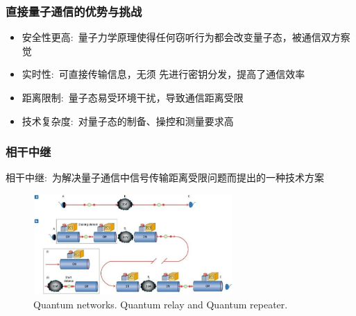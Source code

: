 \begin{frame}
    \frametitle{直接量子通信的优势与挑战}
    \begin{itemize}
        \item 安全性更高:~量子力学原理使得任何窃听行为都会改变量子态，被通信双方察觉
        \item 实时性:~可直接传输信息，无须%
		先进行密钥分发，提高了通信效率
    \end{itemize}
    \begin{itemize}
        \item 距离限制:~量子态易受环境干扰，导致通信距离受限\\
		{\fontsize{7.5pt}{5.2pt}\selectfont{目前难以实现长距离的直接量子通信}}
        \item 技术复杂度:~对量子态的制备、操控和测量要求高\\
		{\fontsize{7.5pt}{5.2pt}\selectfont{技术实现难度大}}
    \end{itemize}
\end{frame}

\begin{frame}
    \frametitle{相干中继}
        相干中继:~为解决量子通信中信号传输距离受限问题而提出的一种技术方案\\
	{\fontsize{7.5pt}{5.2pt}\selectfont{在量子信号传输过程中，能有效延长量子态的传输距离，同时保持量子态的相干性}}
    \begin{figure}
        \centering
                \includegraphics[height=1.5in, width=3.0in, viewport=0 0 725 366,clip]{Figures/Quantum-networksa-Quantum_relay-Entanglement-resources-Quantum_repeater.jpeg}
		\caption{\tiny{\textrm{Quantum networks. Quantum relay and Quantum repeater.}}}%
		\label{Fig:Quantum-networksa-Quantum_relay-Entanglement-resources-Quantum_repeater}
    \end{figure}
\end{frame}

